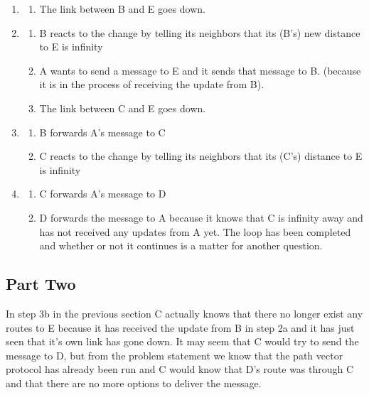 \documentclass[a4paper]{article}
\begin{document}
\begin{enumerate}
	\item \begin{enumerate}
		\item The link between B and E goes down.\\
	\end{enumerate}

	\item \begin{enumerate}
		\item B reacts to the change by telling its neighbors that its (B's) new distance to E is infinity\\
		\item A wants to send a message to E and it sends that message to B. (because it is in the process of receiving the update from B).\\
		\item The link between C and E goes down.\\
	\end{enumerate}

	\item \begin{enumerate}
		\item B forwards A's message to C\\
		\item C reacts to the change by telling its neighbors that its (C's) distance to E is infinity\\
	\end{enumerate}

	\item \begin{enumerate}
		\item C forwards A's message to D\\
		\item D forwards the message to A because it knows that C is infinity away and has not received any updates from A yet. The loop has been completed and whether or not it continues is a matter for another question.\\
	\end{enumerate}

\end{enumerate}

\subsection{Part Two}
In step 3b in the previous section C actually knows that there no longer exist any routes to E because it has received
the update from B in step 2a and it has just seen that it's own link has gone down. It may seem that C would try to
send the message to D, but from the problem statement we know that the path vector protocol has already been run and
C would know that D's route was through C and that there are no more options to deliver the message.
\end{document}
